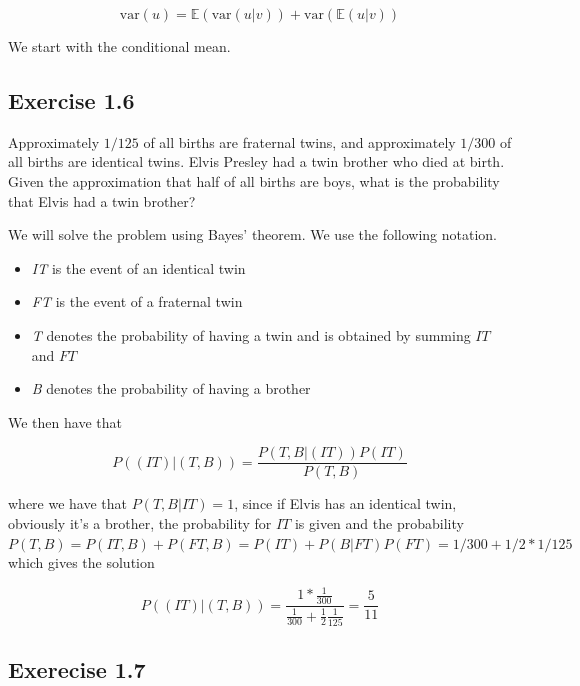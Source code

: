 \documentclass[]{article}
\providecommand{\tightlist}{%
  \setlength{\itemsep}{0pt}\setlength{\parskip}{0pt}}
\begin{document}
\[\begin{equation}
\text{var}(u) = \mathbb{E}(\text{var}(u|v))+\text{var}(\mathbb{E}(u|v))
\end{equation}\]

We start with the conditional mean.

\subsection{Exercise 1.6}\label{exercise-1.6}

Approximately \(1/125\) of all births are fraternal twins, and
approximately \(1/300\) of all births are identical twins. Elvis Presley
had a twin brother who died at birth. Given the approximation that half
of all births are boys, what is the probability that Elvis had a twin
brother?

We will solve the problem using Bayes' theorem. We use the following
notation.

\begin{itemize}
\tightlist
\item
  \emph{IT} is the event of an identical twin
\item
  \emph{FT} is the event of a fraternal twin
\item
  \emph{T} denotes the probability of having a twin and is obtained by
  summing \(IT\) and \(FT\)
\item
  \emph{B} denotes the probability of having a brother
\end{itemize}

We then have that

\[\begin{equation}
P((IT)|(T,B))=\frac{P(T,B|(IT))P(IT)}{P(T,B)}
\end{equation}\]

where we have that \(P(T,B|IT)=1\), since if Elvis has an identical
twin, obviously it's a brother, the probability for \(IT\) is given and
the probability
\(P(T,B)=P(IT,B)+P(FT,B)=P(IT)+P(B|FT)P(FT)=1/300+1/2 *1/125\) which
gives the solution

\[\begin{equation}
P((IT)|(T,B))=\frac{1*\frac{1}{300}}{\frac{1}{300}+\frac{1}{2}\frac{1}{125}}=\frac{5}{11}
\end{equation}\]

\subsection{Exerecise 1.7}\label{exerecise-1.7}
\end{document}
